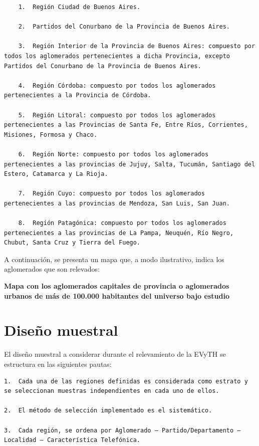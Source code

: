 \documentclass[
  openany]{book}
\begin{document}
\begin{verbatim}
    1.  Región Ciudad de Buenos Aires.
    
    2.  Partidos del Conurbano de la Provincia de Buenos Aires.
    
    3.  Región Interior de la Provincia de Buenos Aires: compuesto por todos los aglomerados pertenecientes a dicha Provincia, excepto Partidos del Conurbano de la Provincia de Buenos Aires.
    
    4.  Región Córdoba: compuesto por todos los aglomerados pertenecientes a la Provincia de Córdoba.
    
    5.  Región Litoral: compuesto por todos los aglomerados pertenecientes a las Provincias de Santa Fe, Entre Ríos, Corrientes, Misiones, Formosa y Chaco.
    
    6.  Región Norte: compuesto por todos los aglomerados pertenecientes a las provincias de Jujuy, Salta, Tucumán, Santiago del Estero, Catamarca y La Rioja.
    
    7.  Región Cuyo: compuesto por todos los aglomerados pertenecientes a las provincias de Mendoza, San Luis, San Juan.
    
    8.  Región Patagónica: compuesto por todos los aglomerados pertenecientes a las provincias de La Pampa, Neuquén, Río Negro, Chubut, Santa Cruz y Tierra del Fuego.
\end{verbatim}

A continuación, se presenta un mapa que, a modo ilustrativo, indica los aglomerados que son relevados:

\textbf{Mapa con los aglomerados capitales de provincia o aglomerados urbanos de más de 100.000 habitantes del universo bajo estudio}

\hypertarget{diseuxf1o-muestral}{%
\section{Diseño muestral}\label{diseuxf1o-muestral}}

El diseño muestral a considerar durante el relevamiento de la EVyTH se estructura en las siguientes pautas:

\begin{verbatim}
1.  Cada una de las regiones definidas es considerada como estrato y se seleccionan muestras independientes en cada uno de ellos.

2.  El método de selección implementado es el sistemático.

3.  Cada región, se ordena por Aglomerado – Partido/Departamento – Localidad – Característica Telefónica.
\end{verbatim}
\end{document}
